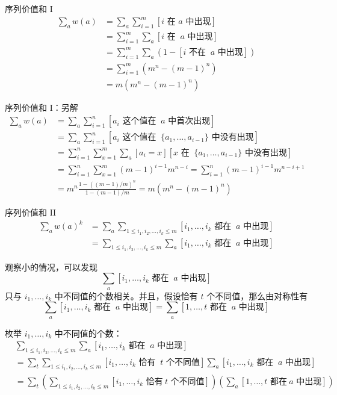 \begin{frame}{序列价值和 I}
    $$
    \begin{aligned}
    \sum_{a}w(a)&=\sum_a\sum_{i=1}^m[i\text{ 在 }a\text{ 中出现}]\\
    &=\sum_{i=1}^m\sum_a[i\text{ 在 }\ a\text{ 中出现}]\\
    &=\sum_{i=1}^m\sum_a(1-[i\text{ 不在 }\ a\text{ 中出现}])\\
    &=\sum_{i=1}^m(m^n-(m-1)^n)\\
    &=m(m^n-(m-1)^n)
    \end{aligned}
    $$
\end{frame}
\begin{frame}{序列价值和 I：另解}
    $$
    \begin{aligned}
    \sum_{a}w(a)&=\sum_a\sum_{i=1}^n[a_i\text{ 这个值在 }\ a\text{ 中首次出现}]\\
    &=\sum_a\sum_{i=1}^n[a_i\text{ 这个值在 }\ \{a_1,\ldots,a_{i-1}\}\text{ 中没有出现}]\\
    &=\sum_{i=1}^n\sum_{x=1}^m\sum_{a}[a_i=x][x\text{ 在 }\ \{a_1,\ldots,a_{i-1}\}\text{ 中没有出现}]\\
    &=\sum_{i=1}^n\sum_{x=1}^m(m-1)^{i-1}m^{n-i}=\sum_{i=1}^n(m-1)^{i-1}m^{n-i+1}\\
    &=m^{n}\frac{1-((m-1)/m)^n}{1-(m-1)/m}=m(m^n-(m-1)^n)
    \end{aligned}
    $$
\end{frame}
\begin{frame}{序列价值和 II}
    $$
    \begin{aligned}
    \sum_{a}w(a)^k&=\sum_a\sum_{1\le i_1,i_2,\ldots,i_k\le m}[i_1,\ldots,i_k\text{ 都在 }\ a\text{ 中出现}]\\
    &=\sum_{1\le i_1,i_2,\ldots,i_k\le m}\sum_a[i_1,\ldots,i_k\text{ 都在 }\ a\text{ 中出现}]
    \end{aligned}
    $$

    观察小的情况，可以发现
    $$
    \sum_a[i_1,\ldots,i_k\text{ 都在 }\ a\text{ 中出现}]
    $$
    只与 $i_1,\ldots,i_k$ 中不同值的个数相关。并且，假设恰有 $t$ 个不同值，那么由对称性有
    $$
    \sum_a[i_1,\ldots,i_k\text{ 都在 }\ a\text{ 中出现}]=\sum_a[1,\ldots,t\text{ 都在 }\ a\text{ 中出现}]
    $$
\end{frame}
\begin{frame}
    枚举 $i_1,\ldots,i_k$ 中不同值的个数：
    $$
    \begin{aligned}
        &\sum_{1\le i_1,i_2,\ldots,i_k\le m}\sum_a[i_1,\ldots,i_k\text{ 都在 }\ a\text{ 中出现}]\\
        &=\sum_t\sum_{1\le i_1,i_2,\ldots,i_k\le m}[i_1,\ldots,i_k\text{ 恰有 }\ t\text{ 个不同值}]\sum_a[i_1,\ldots,i_k\text{ 都在 }\ a\text{ 中出现}]\\
        &=\sum_t\left(\sum_{1\le i_1,i_2,\ldots,i_k\le m}[i_1,\ldots,i_k\text{ 恰有}\ t\text{ 个不同值}]\right)\left(\sum_a[1,\ldots,t\text{ 都在}\ a\text{ 中出现}]\right)
        \end{aligned}
    $$
\end{frame}
